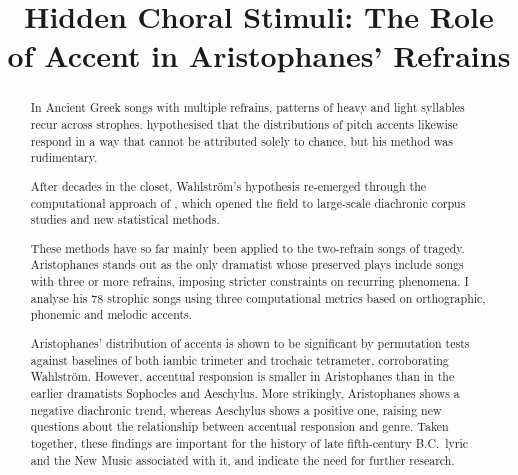 \documentclass[twoside]{article}
\begin{document}

\title{Hidden Choral Stimuli: The Role of Accent in Aristophanes’ Refrains}
\author{
}
\date{}
\maketitle          
\thispagestyle{empty}


\begin{abstract}
In Ancient Greek songs with multiple refrains, patterns of heavy and light syllables recur across strophes. \textcite{wahlstromAccentualResponsionGreek1970} hypothesised that the distributions of pitch accents likewise respond in a way that cannot be attributed solely to chance, but his method was rudimentary. 

After decades in the closet, Wahlström's hypothesis re-emerged through the computational approach of \textcite{conserPitchAccentMelody2020}, which opened the field to large-scale diachronic corpus studies and new statistical methods. 

These methods have so far mainly been applied to the two-refrain songs of tragedy. Aristophanes stands out as the only dramatist whose preserved plays include songs with three or more refrains, imposing stricter constraints on recurring phenomena. I analyse his 78 strophic songs using three computational metrics based on orthographic, phonemic and melodic accents. 

Aristophanes' distribution of accents is shown to be significant by permutation tests against baselines of both iambic trimeter and trochaic tetrameter, corroborating Wahlström. However, accentual responsion is smaller in Aristophanes than in the earlier dramatists Sophocles and Aeschylus. More strikingly, Aristophanes shows a negative diachronic trend, whereas Aeschylus shows a positive one, raising new questions about the relationship between accentual responsion and genre. Taken together, these findings are important for the history of late fifth-century B.C.\ lyric and the New Music associated with it, and indicate the need for further research. 
\end{abstract}

\end{document}

